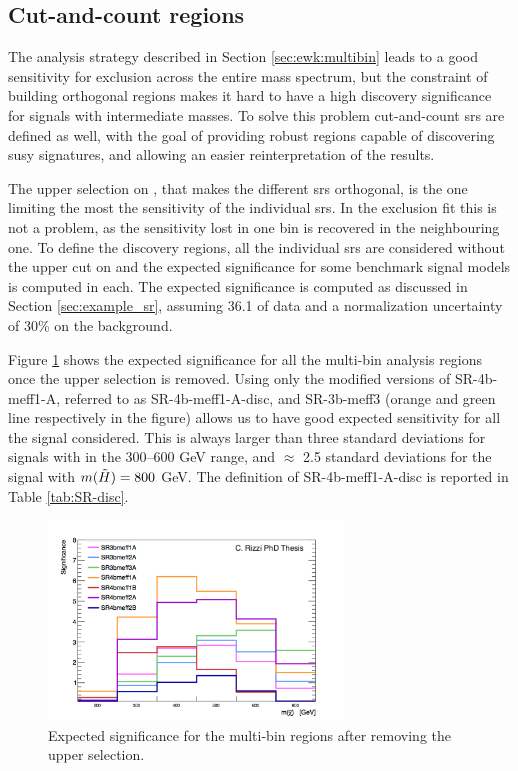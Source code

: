 \subsection{Cut-and-count regions}

The analysis strategy described in Section \ref{sec:ewk:multibin} leads to a good sensitivity for exclusion across the entire mass spectrum, 
but the constraint of building orthogonal regions makes it hard to have a high discovery significance 
for signals with intermediate masses. 
To solve this problem cut-and-count \glspl{sr} are defined as well, with the goal of
providing robust regions capable of discovering \gls{susy} signatures, 
and allowing an easier reinterpretation of the results.

The upper selection on \meffb, that makes the different \glspl{sr} orthogonal, 
is the one limiting the most the sensitivity of the individual \glspl{sr}.
In the exclusion fit this is not a problem, as the sensitivity lost in one bin is recovered in the neighbouring one. 
To define the discovery regions, all the individual \glspl{sr} are considered without the upper cut on \meffb
and the expected significance for some benchmark signal models is computed in each. 
The expected significance is computed as discussed in Section \ref{sec:example_sr}, 
assuming 36.1 \ifb{} of data and a normalization uncertainty of 30\% on the background. 

Figure \ref{fig:ewk:disc_sig} shows the expected significance for all the multi-bin analysis regions once the upper \meffb 
selection is removed. 
Using only the modified versions of SR-4b-meff1-A, referred to as SR-4b-meff1-A-disc, 
and SR-3b-meff3 (orange and green line respectively in the figure) allows us to have good expected sensitivity for 
all the signal considered.  
This is always larger than three standard deviations for 
signals with \mhino  
in the 300--600 GeV range, and $\approx$ 2.5 standard deviations for the signal with $m(\tilde{H})=800$ GeV. 
The definition of SR-4b-meff1-A-disc is reported in Table \ref{tab:SR-disc}.

\begin{figure}[htbp]
\centering
\includegraphics[width=0.7\textwidth]{figures/ewk_prod/discovery/significances_hh_regions.pdf}
\caption{Expected significance for the multi-bin regions after removing the upper \meffb selection. 
\label{fig:ewk:disc_sig}
}
\end{figure}


